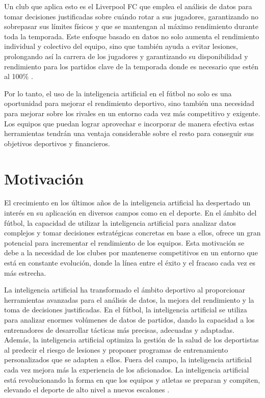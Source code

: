 Un club que aplica esto es el Liverpool FC que emplea el análisis de datos para tomar decisiones justificadas sobre cuándo rotar a sus jugadores, garantizando no sobrepasar sus límites físicos y que se mantengan al máximo rendimiento durante toda la temporada. Este enfoque basado en datos no solo aumenta el rendimiento individual y colectivo del equipo, sino que también ayuda a evitar lesiones, prolongando así la carrera de los jugadores y garantizando su disponibilidad y rendimiento para los partidos clave de la temporada donde es necesario que estén al 100\% \cite{liverpool}.

Por lo tanto, el uso de la inteligencia artificial en el fútbol no solo es una oportunidad para mejorar el rendimiento deportivo, sino también una necesidad para mejorar sobre los rivales en un entorno cada vez más competitivo y exigente. Los equipos que puedan lograr aprovechar e incorporar de manera efectiva estas herramientas tendrán una ventaja considerable sobre el resto para conseguir sus objetivos deportivos y financieros.

















\section{Motivación}

El crecimiento en los últimos años de la inteligencia artificial ha despertado un interés en su aplicación en diversos campos como en el deporte. En el ámbito del fútbol, la capacidad de utilizar la inteligencia artificial para analizar datos complejos y tomar decisiones estratégicas concretas en base a ellos, ofrece un gran potencial para incrementar el rendimiento de los equipos. Esta motivación se debe a la necesidad de los clubes por mantenerse competitivos en un entorno que está en constante evolución, donde la línea entre el éxito y el fracaso cada vez es más estrecha.

La inteligencia artificial ha transformado el ámbito deportivo al proporcionar herramientas avanzadas para el análisis de datos, la mejora del rendimiento y la toma de decisiones justificadas. En el fútbol, la inteligencia artificial se utiliza para analizar enormes volúmenes de datos de partidos, dando la capacidad a los entrenadores de desarrollar tácticas más precisas, adecuadas y adaptadas. Además, la inteligencia artificial optimiza la gestión de la salud de los deportistas al predecir el riesgo de lesiones y proponer programas de entrenamiento personalizados que se adapten a ellos. Fuera del campo, la inteligencia artificial cada vez mejora más la experiencia de los aficionados. La inteligencia artificial está revolucionando la forma en que los equipos y atletas se preparan y compiten, elevando el deporte de alto nivel a nuevos escalones \cite{ia-deporte}.


